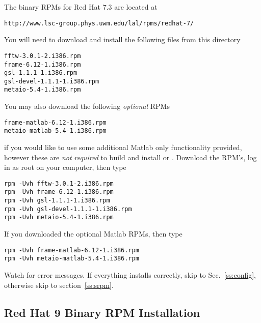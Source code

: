 The binary RPMs for Red Hat 7.3 are located at
\begin{verbatim}
http://www.lsc-group.phys.uwm.edu/lal/rpms/redhat-7/
\end{verbatim}
You will need to download and install the following files from this directory
\begin{verbatim}
fftw-3.0.1-2.i386.rpm
frame-6.12-1.i386.rpm
gsl-1.1.1-1.i386.rpm
gsl-devel-1.1.1-1.i386.rpm
metaio-5.4-1.i386.rpm
\end{verbatim}
You may also download the following \emph{optional} RPMs 
\begin{verbatim}
frame-matlab-6.12-1.i386.rpm
metaio-matlab-5.4-1.i386.rpm
\end{verbatim}
if you would like to use some additional Matlab only functionality provided,
however these are \emph{not required} to build and install \lal or \lalapps.
Download the RPM's, log in as root on your computer, then type
\begin{verbatim}
rpm -Uvh fftw-3.0.1-2.i386.rpm
rpm -Uvh frame-6.12-1.i386.rpm
rpm -Uvh gsl-1.1.1-1.i386.rpm
rpm -Uvh gsl-devel-1.1.1-1.i386.rpm
rpm -Uvh metaio-5.4-1.i386.rpm
\end{verbatim}
If you downloaded the optional Matlab RPMs, then type
\begin{verbatim}
rpm -Uvh frame-matlab-6.12-1.i386.rpm
rpm -Uvh metaio-matlab-5.4-1.i386.rpm
\end{verbatim}
Watch for error messages.  If everything installs correctly,  skip to
Sec.~\ref{ss:config},  otherwise skip to section~\ref{ss:srpm}.

\subsection{Red Hat 9 Binary RPM Installation}
\label{ss:rh9}

